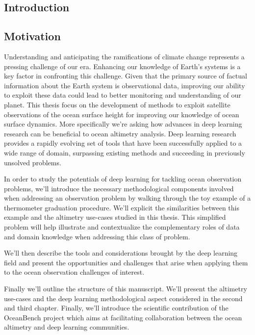 \begin{bibunit}

\chapter*{Introduction}

  \section{Motivation}
Understanding and anticipating the ramifications of climate change represents a pressing challenge of our era.
Enhancing our knowledge of Earth's systems is a key factor in confronting this challenge.
  Given that the primary source of factual information about the Earth system is observational data, improving our ability to exploit these data could lead to better monitoring and understanding of our planet.
  This thesis focus on the development of methods to exploit satellite observations of the ocean surface height for improving our knowledge of ocean surface dynamics. 
  More specifically we're asking how advances in deep learning research can be beneficial to ocean altimetry analysis.
  Deep learning research provides a rapidly evolving set of tools that have been successfully applied to a wide range of domain, surpassing existing methods and succeeding in previously unsolved problems.
  
  In order to study the potentials of deep learning for tackling ocean observation problems, we'll introduce the necessary methodological components involved when addressing an observation problem by walking through the toy example of a thermometer graduation procedure.
  We'll explicit the similarities between this example and the altimetry use-cases studied in this thesis. This simplified problem will help illustrate and contextualize the complementary roles of data and domain knowledge when addressing this class of problem. 
  
  We'll then describe the tools and considerations brought by the deep learning field and present the opportunities and challenges that arise when applying them to the ocean observation challenges of interest.

  Finally we'll outline the structure of this manuscript. We'll present the altimetry use-cases and the deep learning methodological aspect considered in the second and third chapter. Finally, we'll introduce the scientific contribution of the OceanBench project which aims at facilitating collaboration between the ocean altimetry and deep learning communities.
  



\end{bibunit}
